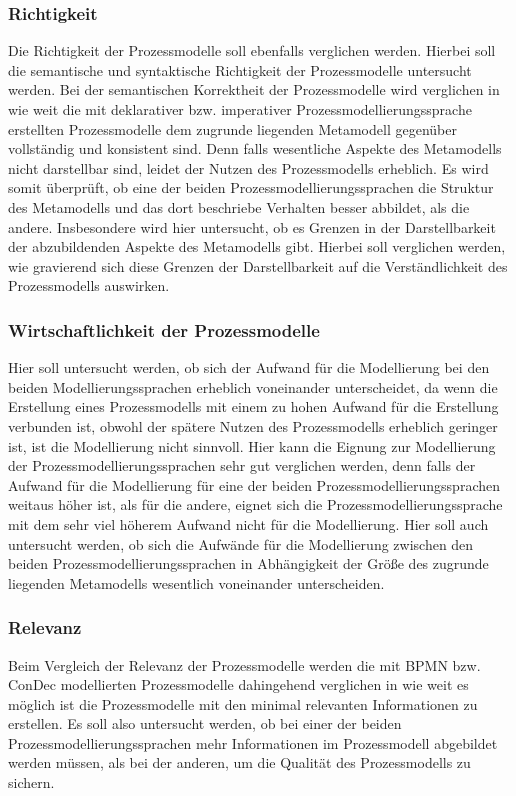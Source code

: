 \subsubsection{Richtigkeit}
Die Richtigkeit der Prozessmodelle soll ebenfalls verglichen werden. Hierbei soll die semantische und syntaktische Richtigkeit der Prozessmodelle untersucht werden.
Bei der semantischen Korrektheit der Prozessmodelle wird verglichen in wie weit die mit deklarativer bzw. imperativer Prozessmodellierungssprache erstellten Prozessmodelle dem zugrunde liegenden Metamodell gegenüber vollständig und konsistent sind. Denn falls wesentliche Aspekte des Metamodells nicht darstellbar sind, leidet der Nutzen des Prozessmodells erheblich. Es wird somit überprüft, ob eine der beiden Prozessmodellierungssprachen die Struktur des Metamodells und das dort beschriebe Verhalten besser abbildet, als die andere. Insbesondere wird hier untersucht, ob es Grenzen in der Darstellbarkeit der abzubildenden Aspekte des Metamodells gibt. Hierbei soll verglichen werden, wie gravierend sich diese Grenzen der Darstellbarkeit auf die Verständlichkeit des Prozessmodells auswirken.
\subsubsection{Wirtschaftlichkeit der Prozessmodelle}
Hier soll untersucht werden, ob sich der Aufwand für die Modellierung bei den beiden Modellierungssprachen erheblich voneinander unterscheidet, da wenn die Erstellung eines Prozessmodells mit einem zu hohen Aufwand für die Erstellung verbunden ist, obwohl der spätere Nutzen des Prozessmodells erheblich geringer ist, ist die Modellierung nicht sinnvoll. Hier kann die Eignung zur Modellierung der Prozessmodellierungssprachen sehr gut verglichen werden, denn falls der Aufwand für die Modellierung für eine der beiden Prozessmodellierungssprachen weitaus höher ist, als für die andere, eignet sich die Prozessmodellierungssprache mit dem sehr viel höherem Aufwand nicht für die Modellierung. Hier soll auch untersucht werden, ob sich die Aufwände für die Modellierung zwischen den beiden Prozessmodellierungssprachen in Abhängigkeit der Größe des zugrunde liegenden Metamodells wesentlich voneinander unterscheiden.
\subsubsection{Relevanz}
Beim Vergleich der Relevanz der Prozessmodelle werden die mit BPMN bzw. ConDec modellierten Prozessmodelle dahingehend verglichen in wie weit es möglich ist die Prozessmodelle mit den minimal relevanten Informationen zu erstellen. Es soll also untersucht werden, ob bei einer der beiden Prozessmodellierungssprachen mehr Informationen im Prozessmodell abgebildet werden müssen, als bei der anderen, um die Qualität des Prozessmodells zu sichern. 
